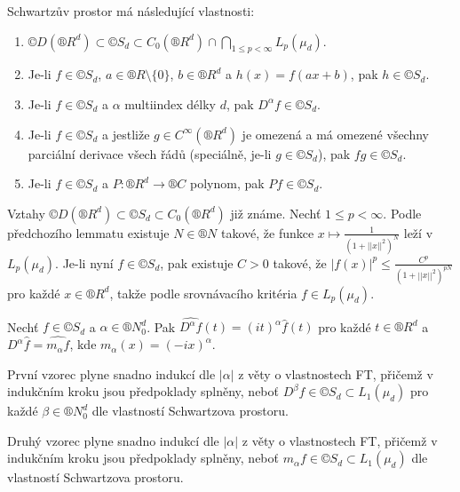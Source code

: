 \documentclass[12pt]{article}					%
\begin{document}
\begin{tvrzeni}
	Schwartzův prostor má následující vlastnosti:

	\begin{enumerate}
		\item $©D(®R^d) \subset ©S_d \subset C_0(®R^d) \cap \bigcap_{1 ≤ p < ∞} L_p(\mu_d)$.
		\item Je-li $f \in ©S_d$, $a \in ®R \setminus \{0\}$, $b \in ®R^d$ a $h(x) = f(a x + b)$, pak $h \in ©S_d$.
		\item Je-li $f \in ©S_d$ a $\alpha$ multiindex délky $d$, pak $D^\alpha f \in ©S_d$.
		\item Je-li $f \in ©S_d$ a jestliže $g \in C^∞(®R^d)$ je omezená a má omezené všechny parciální derivace všech řádů (speciálně, je-li $g \in ©S_d$), pak $f g \in ©S_d$.
		\item Je-li $f \in ©S_d$ a $P : ®R^d \rightarrow ®C$ polynom, pak $P f \in ©S_d$.
	\end{enumerate}

	\begin{dukazin}[Pouze 1.]
		Vztahy $©D(®R^d) \subset ©S_d \subset C_0(®R^d)$ již známe. Nechť $1 ≤ p < ∞$. Podle předchozího lemmatu existuje $N \in ®N$ takové, že funkce $x \mapsto \frac{1}{(1 + ||x||^2)^N}$ leží v $L_p(\mu_d)$. Je-li nyní $f \in ©S_d$, pak existuje $C > 0$ takové, že $|f(x)|^p ≤ \frac{C^p}{(1 + ||x||^2)^{p N}}$ pro každé $x \in ®R^d$, takže podle srovnávacího kritéria $f \in L_p(\mu_d)$.
	\end{dukazin}
\end{tvrzeni}

\begin{tvrzeni}
	Nechť $f \in ©S_d$ a $\alpha \in ®N_0^d$. Pak $\widehat{D^\alpha f}(t) = (i t)^\alpha \hat{f}(t)$ pro každé $t \in ®R^d$ a $D^\alpha \hat{f} = \widehat{m_\alpha f}$, kde $m_\alpha(x) = (-i x)^\alpha$.

	\begin{dukazin}
		První vzorec plyne snadno indukcí dle $|\alpha|$ z věty o vlastnostech FT, přičemž v indukčním kroku jsou předpoklady splněny, neboť $D^\beta f \in ©S_d \subset L_1(\mu_d)$ pro každé $\beta \in ®N_0^d$ dle vlastností Schwartzova prostoru.

		Druhý vzorec plyne snadno indukcí dle $|\alpha|$ z věty o vlastnostech FT, přičemž v indukčním kroku jsou předpoklady splněny, neboť $m_\alpha f \in ©S_d \subset L_1(\mu_d)$ dle vlastností Schwartzova prostoru.
	\end{dukazin}
\end{tvrzeni}
\end{document}
